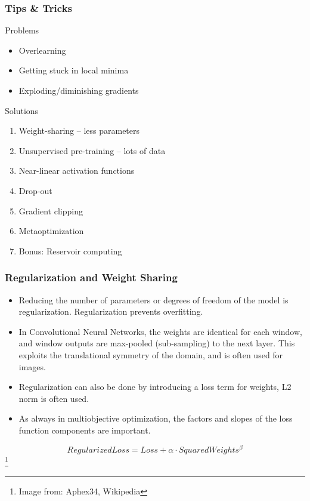 \documentclass[8pt]{beamer}
\begin{document}
\begin{frame}
\frametitle{Tips \& Tricks}
 \begin{block}{Problems}
  \begin{itemize}
   \item Overlearning
   \item Getting stuck in local minima
   \item Exploding/diminishing gradients
  \end{itemize}
 \end{block}

 \begin{block}{Solutions}
  \begin{enumerate}
   \item Weight-sharing – less parameters
   \item Unsupervised pre-training – lots of data
   \item Near-linear activation functions
   \item Drop-out
   \item Gradient clipping
   \item Metaoptimization
   \item Bonus: Reservoir computing 
  \end{enumerate}
 \end{block}

\end{frame}

\begin{frame}
\frametitle{Regularization and Weight Sharing}
 \begin{itemize}
  \item Reducing the number of parameters or degrees of freedom of the model is regularization. Regularization prevents overfitting.
  \item In Convolutional Neural Networks, the weights are identical for each window, and window outputs are max-pooled (sub-sampling) to the next layer.
        This exploits the translational symmetry of the domain, and is often used for images.
  \item Regularization can also be done by introducing a loss term for weights, L2 norm is often used.
  \item As always in multiobjective optimization, the factors and slopes of the loss function components are important.
 \end{itemize}
 \begin{displaymath}
  RegularizedLoss = Loss + \alpha \cdot SquaredWeights^\beta
 \end{displaymath}
 \footnote{Image from: Aphex34, Wikipedia}
\end{frame}
\end{document}
